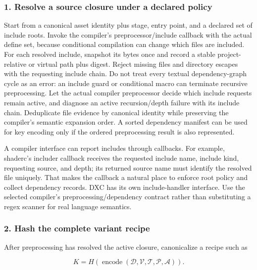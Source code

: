 \subsubsection{1. Resolve a source closure under a declared policy}\label{05-engine-i-ch010-resolve-a-source-closure-under-a-declared-policy}

\hypertarget{05-engine-i-ch010-resolve-a-source-closure-under-a-declared-policy}{}

Start from a canonical asset identity plus stage, entry point, and a declared set of include roots. Invoke the compiler's preprocessor/include callback with the actual define set, because conditional compilation can change which files are included. For each resolved include, snapshot its bytes once and record a stable project-relative or virtual path plus digest. Reject missing files and directory escapes with the requesting include chain. Do not treat every textual dependency-graph cycle as an error: an include guard or conditional macro can terminate recursive preprocessing. Let the actual compiler preprocessor decide which include requests remain active, and diagnose an active recursion/depth failure with its include chain. Deduplicate file evidence by canonical identity while preserving the compiler's semantic expansion order. A sorted dependency manifest can be used for key encoding only if the ordered preprocessing result is also represented.

A compiler interface can report includes through callbacks. For example, shaderc's includer callback receives the requested include name, include kind, requesting source, and depth; its returned source name must identify the resolved file uniquely. That makes the callback a natural place to enforce root policy and collect dependency records. DXC has its own include-handler interface. Use the selected compiler's preprocessing/dependency contract rather than substituting a regex scanner for real language semantics.

\subsubsection{2. Hash the complete variant recipe}\label{05-engine-i-ch010-hash-the-complete-variant-recipe}

\hypertarget{05-engine-i-ch010-hash-the-complete-variant-recipe}{}

After preprocessing has resolved the active closure, canonicalize a recipe such as

\[
K=H(\operatorname{encode}(\mathcal D,\mathcal V,\mathcal T,\mathcal P,\mathcal A)).
\]

